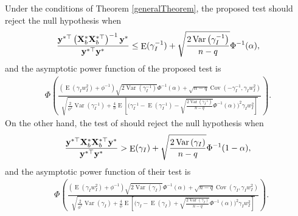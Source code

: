 \documentclass[smallextended]{svjour3}       %
\DeclareMathOperator{\myE}{E}
\DeclareMathOperator{\myVar}{Var}
\DeclareMathOperator{\myCov}{Cov}
\newcommand{\By}{\mathbf{y}}    \newcommand{\Bz}{\mathbf{z}}
\begin{document}
Under the conditions of Theorem \ref{generalTheorem}, the proposed test should reject the null hypothesis when
\begin{equation*}
        \frac{
            \By^{*\top} \left( \BX_b^* \BX_b^{*\top} \right)^{-1} \By^*
        }{
            \By^{*\top} \By^*
        } 
        \leq 
        \myE (\gamma_I^{-1})
        +\sqrt{
            \frac{2\myVar\left( \gamma_I^{-1} \right)}{n-q} 
        }
        \Phi^{-1}(\alpha),
\end{equation*}
and the asymptotic power function of the proposed test is
\begin{equation*}\label{eq:powerProposed}
    \begin{split}
    \Phi\left( 
        \frac{
            \left( \myE (\gamma_I w_I^2) + \phi^{-1} \right)
            \sqrt{2\myVar\left( \gamma_I^{-1} \right)} 
            \Phi^{-1}(\alpha)
            +
            \sqrt{n-q}
            \myCov\left( - \gamma_I^{-1}, \gamma_I w_I^2 \right)
        }{
            \sqrt{
                \frac{2}{\phi^{2}}
                \myVar ( \gamma_I^{-1} ) 
                +
                \frac{4}{\phi}
        \myE\left[ 
            \Big( \gamma_I^{-1} -\myE(\gamma_I^{-1}) -\sqrt{\frac{2\myVar (\gamma_I^{-1})}{n-q}} \Phi^{-1}(\alpha) \Big)^2
        \gamma_I w_I^2
    \right]
            }
        } 
    \right).
    \end{split}
\end{equation*}
On the other hand, the test of \cite{Goeman2006} should reject the null hypothesis when
\begin{equation*}
        \frac{
            \By^{*\top} \BX_b^* \BX_b^{*\top} \By^*
        }{
            \By^{*\top} \By^*
        } 
        >
        \myE (\gamma_I)
        +\sqrt{
            \frac{2\myVar\left( \gamma_I \right)}{n-q} 
        }
        \Phi^{-1}(1-\alpha),
\end{equation*}
and the asymptotic power function of their test is
\begin{equation*}\label{eq:powerTheirs}
    \begin{split}
    &\Phi\left( 
        \frac{
            \left( \myE (\gamma_I w_I^2) + \phi^{-1} \right)
            \sqrt{2\myVar\left( \gamma_I \right)} 
            \Phi^{-1}(\alpha)
            +
            \sqrt{n-q}
            \myCov\left( \gamma_I, \gamma_I w_I^2 \right)
        }{
            \sqrt{
                \frac{2}{\phi^{2}} \myVar ( \gamma_I ) 
                +
                \frac{4}{\phi}
    \myE\left[ 
        \Big( \gamma_I -\myE(\gamma_I) +\sqrt{\frac{2\myVar (\gamma_I)}{n-q}} \Phi^{-1}(\alpha) \Big)^2
        \gamma_I w_I^2
    \right]
            }
        } 
    \right).
    \end{split}
\end{equation*}
\end{document}
